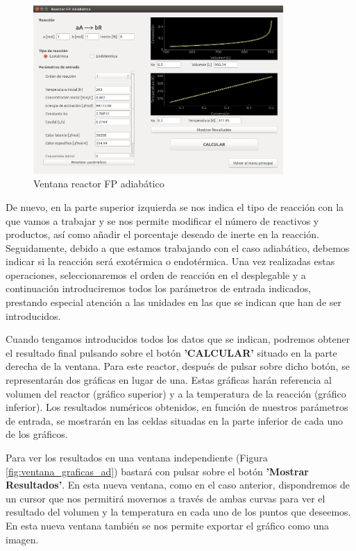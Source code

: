 \begin{figure}[h!]
	\begin{center}
		\includegraphics[width=0.85\textwidth]{./imagenes/reactor_fp/adiabatico1.png}\caption{Ventana reactor FP adiabático}\label{fig:ventana_adiabatico}
	\end{center}
\end{figure}

De nuevo, en la parte superior izquierda se nos indica el tipo de reacción con la que vamos a trabajar y se nos permite modificar el número de reactivos y productos, así como añadir el porcentaje deseado de inerte en la reacción. Seguidamente, debido a que estamos trabajando con el caso adiabático, debemos indicar si la reacción será exotérmica o endotérmica. Una vez realizadas estas operaciones, seleccionaremos el orden de reacción en el desplegable y a continuación introduciremos todos los parámetros de entrada indicados, prestando especial atención a las unidades en las que se indican que han de ser introducidos.

Cuando tengamos introducidos todos los datos que se indican, podremos obtener el resultado final pulsando sobre el botón \textbf{'CALCULAR'} situado en la parte derecha de la ventana. Para este reactor, después de pulsar sobre dicho botón, se representarán dos gráficas en lugar de una. Estas gráficas harán referencia al volumen del reactor (gráfico superior) y a la temperatura de la reacción (gráfico inferior). Los resultados numéricos obtenidos, en función de nuestros parámetros de entrada, se mostrarán en las celdas situadas en la parte inferior de cada uno de los gráficos.

Para ver los resultados en una ventana independiente (Figura \ref{fig:ventana_graficas_ad}) bastará con pulsar sobre el botón \textbf{'Mostrar Resultados'}. En esta nueva ventana, como en el caso anterior, dispondremos de un cursor que nos permitirá movernos a través de ambas curvas para ver el resultado del volumen y la temperatura en cada uno de los puntos que deseemos. En esta nueva ventana también se nos permite exportar el gráfico como una imagen.

